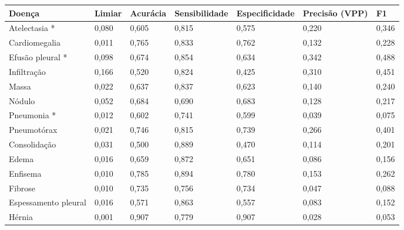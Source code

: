 \begin{tabular}{lllllll}
\toprule
Doença & Limiar & Acurácia & Sensibilidade & Especificidade & Precisão (VPP) & F1 \\
\midrule
Atelectasia * & 0,080 & 0,605 & 0,815 & 0,575 & 0,220 & 0,346 \\
Cardiomegalia & 0,011 & 0,765 & 0,833 & 0,762 & 0,132 & 0,228 \\
Efusão pleural * & 0,098 & 0,674 & 0,854 & 0,634 & 0,342 & 0,488 \\
Infiltração & 0,166 & 0,520 & 0,824 & 0,425 & 0,310 & 0,451 \\
Massa & 0,022 & 0,637 & 0,837 & 0,623 & 0,140 & 0,240 \\
Nódulo & 0,052 & 0,684 & 0,690 & 0,683 & 0,128 & 0,217 \\
Pneumonia * & 0,012 & 0,602 & 0,741 & 0,599 & 0,039 & 0,075 \\
Pneumotórax & 0,021 & 0,746 & 0,815 & 0,739 & 0,266 & 0,401 \\
Consolidação & 0,031 & 0,500 & 0,889 & 0,470 & 0,114 & 0,201 \\
Edema & 0,016 & 0,659 & 0,872 & 0,651 & 0,086 & 0,156 \\
Enfisema & 0,010 & 0,785 & 0,894 & 0,780 & 0,153 & 0,262 \\
Fibrose & 0,010 & 0,735 & 0,756 & 0,734 & 0,047 & 0,088 \\
Espessamento pleural & 0,016 & 0,571 & 0,863 & 0,557 & 0,083 & 0,152 \\
Hérnia & 0,001 & 0,907 & 0,779 & 0,907 & 0,028 & 0,053 \\
\bottomrule
\end{tabular}
